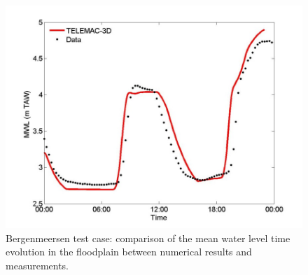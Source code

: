 \begin{figure}[H]
\begin{center}
  \includegraphics[scale=1]{img/figure6.png}
\end{center}
\caption{Bergenmeersen test case: comparison of the mean water level time
evolution in the floodplain between numerical results and measurements.}
\label{fig:bergenmeersen_figure6}
\end{figure}


